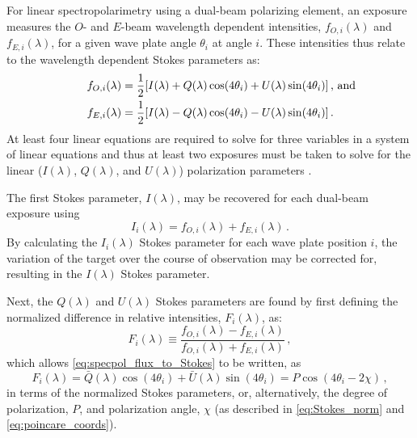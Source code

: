 For linear spectropolarimetry using a dual-beam polarizing element, an exposure measures the $O$- and $E$-beam wavelength dependent intensities, $f_{O, i}(\lambda)$ and $f_{E, i}(\lambda)$, for a given wave plate angle $\theta_{i}$ at angle $i$. These intensities thus relate to the wavelength dependent Stokes parameters as:
\begin{equation} \label{eq:specpol_flux_to_Stokes}
    \begin{aligned}
        f_{O, i}(\lambda) &= \frac{1}{2} [I(\lambda) + Q(\lambda)\cos(4\theta_{i}) + U(\lambda)\sin(4\theta_{i})] \rlap{\,,\ and}\\
        f_{E, i}(\lambda) &= \frac{1}{2} [I(\lambda) - Q(\lambda)\cos(4\theta_{i}) - U(\lambda)\sin(4\theta_{i})]\,.
    \end{aligned}
\end{equation}
At least four linear equations are required to solve for three variables in a system of linear equations and thus at least two exposures must be taken to solve for the linear ($I(\lambda)$, $Q(\lambda)$, and $U(\lambda)$) polarization parameters \citep{pol_std, keller_instr}.

The first Stokes parameter, $I(\lambda)$, may be recovered for each dual-beam exposure using
\begin{equation} \label{eq:specpol_I_calc}
    I_{i}(\lambda) = f_{O, i}(\lambda) + f_{E, i}(\lambda)\,.
\end{equation}
By calculating the $I_{i}(\lambda)$ Stokes parameter for each wave plate position $i$, the variation of the target over the course of observation may be corrected for, resulting in the $I(\lambda)$ Stokes parameter.

Next, the $Q(\lambda)$ and $U(\lambda)$ Stokes parameters are found by first defining the normalized difference in relative intensities, $F_{i}(\lambda)$, as:
\begin{equation} \label{eq:specpol_norm_flux}
    F_{i}(\lambda) \equiv \frac{f_{O, i}(\lambda) - f_{E, i}(\lambda)}{f_{O, i}(\lambda) + f_{E, i}(\lambda)}\,,
\end{equation}
which allows \autoref{eq:specpol_flux_to_Stokes} to be written, as
\begin{equation} \label{eq:specpol_F_to_params}
    F_{i}(\lambda) = \bar{Q}(\lambda) \cos(4\theta_{i}) + \bar{U}(\lambda) \sin(4\theta_{i}) = P\cos(4\theta_{i} - 2\chi)\,,
\end{equation}
in terms of the normalized Stokes parameters, or, alternatively, the degree of polarization, $P$, and polarization angle, $\chi$ (as described in \autoref{eq:Stokes_norm} and \ref{eq:poincare_coords}).

